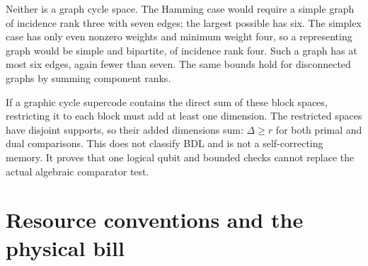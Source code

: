 \documentclass[11pt,a4paper]{article}
\begin{document}
Neither is a graph cycle space. The Hamming case would require a simple graph of incidence rank three with seven edges; the largest possible has six. The simplex case has only even nonzero weights and minimum weight four, so a representing graph would be simple and bipartite, of incidence rank four. Such a graph has at most six edges, again fewer than seven. The same bounds hold for disconnected graphs by summing component ranks.

If a graphic cycle supercode contains the direct sum of these block spaces, restricting it to each block must add at least one dimension. The restricted spaces have disjoint supports, so their added dimensions sum: $\Delta\geq r$ for both primal and dual comparisons. This does not classify BDL and is not a self-correcting memory. It proves that one logical qubit and bounded checks cannot replace the actual algebraic comparator test.

\newpage
\section{Resource conventions and the physical bill}
\end{document}
